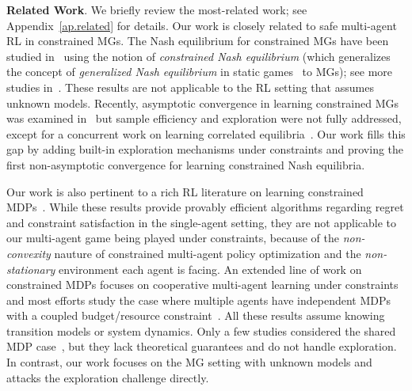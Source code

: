 \documentclass[12pt, final]{l4dc2023}
\begin{document}
\vspace*{1ex}
\noindent\textbf{Related Work}. We briefly review the most-related work; see Appendix~\ref{ap.related} for details. Our work is closely related to safe multi-agent RL in constrained MGs. 
The Nash equilibrium for constrained MGs have been studied in~\cite{altman2000constrained,gomez2003saddle,altman2005zero,alvarez2006existence,altman2007constrained,altman2008constrained,altman2009constrained,singh2014characterization} using the notion of \emph{constrained Nash equilibrium} (which generalizes the concept of \emph{generalized Nash equilibrium} in static games~\citep{arrow1954existence} to MGs); see more studies in~\cite{yaji2015necessary,zhang2019discrete,wei2020discrete,wei2021constrained,zhang2021constrained}. These results are not applicable to the RL setting that assumes unknown models. Recently, asymptotic convergence in learning constrained MGs was examined in~\cite{hakami2015learning,jiang2020finding} but sample efficiency and exploration were not fully addressed, except for a concurrent work on learning correlated equilibria~\citep{
	chenfinding}. Our work fills this gap by adding built-in exploration mechanisms under constraints and proving the first non-asymptotic convergence for learning constrained Nash equilibria. 

Our work is also pertinent to a rich RL literature on learning constrained MDPs~\citep{zheng2020constrained,qiu2020upper,kalagarla2020sample,bai2020model,chow2017risk,tessler2018reward,ding2020natural,ding2020provably, ding2022convergence, wachi2020safe,efroni2020exploration,brantley2020constrained,chen2021primal,liu2021learning,ying2021dual,liu2021fast,bai2021achieving,zhao2021primal,li2021faster,chen2022learning}. While these results provide provably efficient algorithms regarding regret and constraint satisfaction in the single-agent setting, they are not applicable to our multi-agent game being played under constraints, because of the \emph{non-convexity} nauture of constrained multi-agent policy optimization and the \emph{non-stationary} environment each agent is facing. An extended line of work on constrained MDPs focuses on cooperative multi-agent learning under constraints and most efforts study the case where multiple agents have independent MDPs with a coupled budget/resource constraint~\citep{meuleau1998solving,boutilier2016budget,wei2018online,de2020risk,gagrani2020weakly}. All these results assume knowing transition models or system dynamics. Only a few studies considered the shared MDP case~\citep{diddigi2019actor,ludecentralized,parnika2021attention,gu2021multi}, but they lack theoretical guarantees and do not handle exploration. In contrast, our work focuses on the MG setting with unknown models and attacks the exploration challenge directly.
\end{document}
